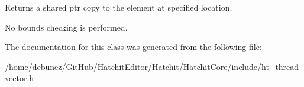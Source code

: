 Returns a shared ptr copy to the element at specified location. 

No bounds checking is performed. 

The documentation for this class was generated from the following file\+:\begin{DoxyCompactItemize}
\item 
/home/debunez/\+Git\+Hub/\+Hatchit\+Editor/\+Hatchit/\+Hatchit\+Core/include/\hyperlink{ht__threadvector_8h}{ht\+\_\+threadvector.\+h}\end{DoxyCompactItemize}
